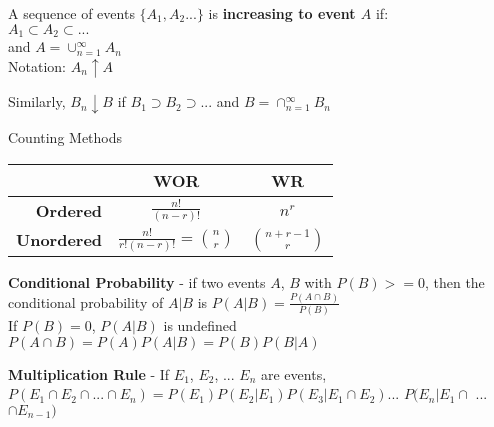 \documentclass[14pt, oneside, letterpaper]{notes}
\begin{document}
\begin{mydef}
	A sequence of events $\{A_1, A_2 ...\}$ is \textbf{increasing to event $A$} if: \\
	\indent $A_1 \subset A_2 \subset ...$  \\
	\indent and $A = \cup_{n=1}^{\infty} A_n$ \\
	\indent Notation: $A_n \uparrow A$
\end{mydef}

\begin{mydef}
	Similarly, $B_n \downarrow B$ if $B_1 \supset B_2 \supset ... $ and
	$B = \cap_{n=1}^{\infty} B_n$ 
\end{mydef}

%
%
\begin{mydef}
Counting Methods
\begin{table}[h!]
	\begin{tabular}{r|c|c}
		& \textbf{WOR} & \textbf{WR} \\
		\hline
		
		\textbf{Ordered} 
		& $\displaystyle \frac{n!}{(n-r)!} $ 
		& $\displaystyle n^r $ \\
		
		\textbf{Unordered} 
		& $\displaystyle \frac{n!}{r!(n-r)!} 
		= {n \choose r} $ 
		& $\displaystyle {n+r-1 \choose r} $ \\
	\end{tabular}
\end{table}

\end{mydef}

%
%

\begin{mydef}
	\textbf{Conditional Probability} - if two events 
	$A$, $B$ with $P(B) >= 0$, then the conditional 
	probability of $A|B$ is $P(A|B) = \frac{P(A\cap B)}
	{P(B)}$ \\
	If $P(B) = 0$, $P(A|B)$ is undefined \\
	$P(A \cap B) = P(A)P(A|B) = P(B)P(B|A)$ \\
\end{mydef}

\begin{mydef}
	\textbf{Multiplication Rule} - 
	If $E_1$, $E_2$, ... $E_n$ are events, \\ 
	$P(E_1 \cap E_2 \cap ... \cap E_n) = 
	P(E_1)P(E_2|E_1)P(E_3|E_1\cap E_2)$...
	$P(E_n|E_1 \cap$ ...$ \cap E_{n-1})$
\end{mydef}

%
%
\end{document}
